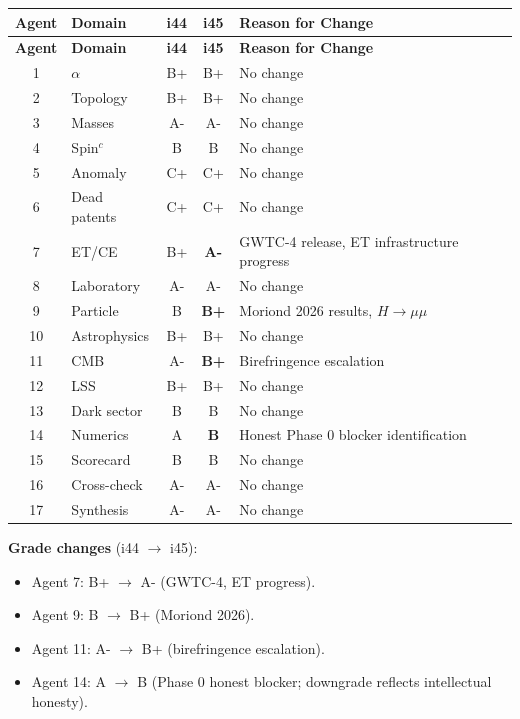 \documentclass[11pt,a4paper]{article}
\begin{document}
\begin{center}
\begin{longtable}{clccp{6cm}}
\toprule
\textbf{Agent} & \textbf{Domain} & \textbf{i44} & \textbf{i45} & \textbf{Reason for Change} \\
\midrule
\endfirsthead
\toprule
\textbf{Agent} & \textbf{Domain} & \textbf{i44} & \textbf{i45} & \textbf{Reason for Change} \\
\midrule
\endhead
1 & $\alpha$ & B+ & B+ & No change \\
2 & Topology & B+ & B+ & No change \\
3 & Masses & A- & A- & No change \\
4 & Spin$^c$ & B & B & No change \\
5 & Anomaly & C+ & C+ & No change \\
6 & Dead patents & C+ & C+ & No change \\
7 & ET/CE & B+ & \textbf{A-} & GWTC-4 release, ET infrastructure progress \\
8 & Laboratory & A- & A- & No change \\
9 & Particle & B & \textbf{B+} & Moriond 2026 results, $H \to \mu\mu$ \\
10 & Astrophysics & B+ & B+ & No change \\
11 & CMB & A- & \textbf{B+} & Birefringence escalation \\
12 & LSS & B+ & B+ & No change \\
13 & Dark sector & B & B & No change \\
14 & Numerics & A & \textbf{B} & Honest Phase 0 blocker identification \\
15 & Scorecard & B & B & No change \\
16 & Cross-check & A- & A- & No change \\
17 & Synthesis & A- & A- & No change \\
\bottomrule
\end{longtable}
\end{center}

\textbf{Grade changes} (i44 $\to$ i45):
\begin{itemize}
\item Agent 7: B+ $\to$ A- (GWTC-4, ET progress).
\item Agent 9: B $\to$ B+ (Moriond 2026).
\item Agent 11: A- $\to$ B+ (birefringence escalation).
\item Agent 14: A $\to$ B (Phase 0 honest blocker; downgrade reflects intellectual honesty).
\end{itemize}
\end{document}
